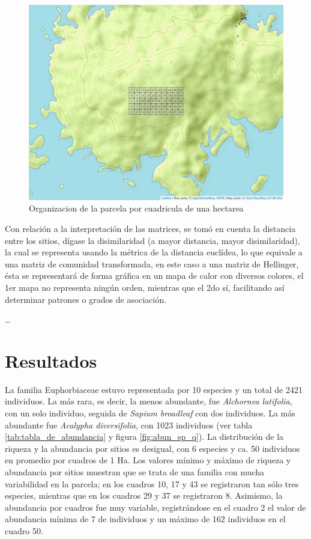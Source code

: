 \documentclass[11pt,]{article}
\begin{document}
\begin{figure}
\centering
\includegraphics{mapa_cuadros.png}
\caption{\label{fig:mapa_cuadros}Organizacion de la parcela por
cuadricula de una hectarea}
\end{figure}

Con relación a la interpretación de las matrices, se tomó en cuenta la
distancia entre los sitios, dígase la disimilaridad (a mayor distancia,
mayor disimilaridad), la cual se representa usando la métrica de la
distancia euclídea, lo que equivale a una matriz de comunidad
transformada, en este caso a una matriz de Hellinger, ésta se
representará de forma gráfica en un mapa de calor con diversos colores,
el 1er mapa no representa ningún orden, mientras que el 2do sí,
facilitando así determinar patrones o grados de asociación.

\ldots

\section{Resultados}\label{resultados}

La familia Euphorbiaceae estuvo representada por 10 especies y un total
de 2421 individuos. La más rara, es decir, la menos abundante, fue
\emph{Alchornea latifolia}, con un solo individuo, seguida de
\emph{Sapium broadleaf} con dos individuos. La más abundante fue
\emph{Acalypha diversifolia}, con 1023 individuos (ver tabla
\ref{tab:tabla_de_abundancia} y figura \ref{fig:abun_sp_q}). La
distribución de la riqueza y la abundancia por sitios es desigual, con 6
especies y ca. 50 individuos en promedio por cuadros de 1 Ha. Los
valores mínimo y máximo de riqueza y abundancia por sitios muestran que
se trata de una familia con mucha variabilidad en la parcela; en los
cuadros 10, 17 y 43 se registraron tan sólo tres especies, mientras que
en los cuadros 29 y 37 se registraron 8. Asimismo, la abundancia por
cuadros fue muy variable, registrándose en el cuadro 2 el valor de
abundancia mínima de 7 de individuos y un máximo de 162 individuos en el
cuadro 50.
\end{document}
